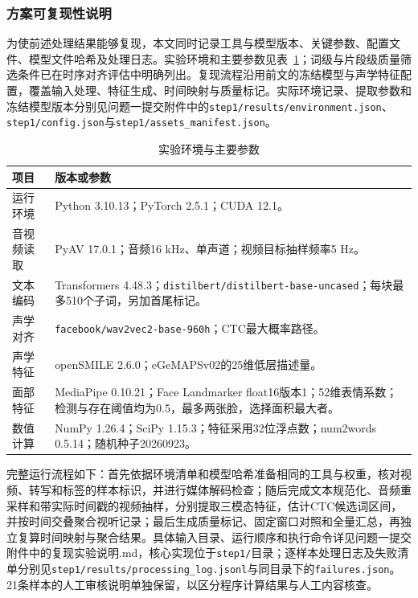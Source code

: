 \subsubsection{方案可复现性说明}
\label{sec:p1_reproducibility}

为使前述处理结果能够复现，本文同时记录工具与模型版本、关键参数、配置文件、模型文件哈希及处理日志。实验环境和主要参数见表~\ref{tab:p1_repro_settings}；词级与片段级质量筛选条件已在时序对齐评估中明确列出。复现流程沿用前文的冻结模型与声学特征配置，覆盖输入处理、特征生成、时间映射与质量标记。实际环境记录、提取参数和冻结模型版本分别见问题一提交附件中的\nolinkurl{step1/results/environment.json}、\nolinkurl{step1/config.json}与\nolinkurl{step1/assets_manifest.json}。

\begin{table}[H]
    \centering\small
    \caption{实验环境与主要参数}
    \label{tab:p1_repro_settings}
    \setlength{\tabcolsep}{6pt}
    \renewcommand{\arraystretch}{1.12}
    \ifdefined\pOneCompactTableBox\else\newsavebox{\pOneCompactTableBox}\fi
    \begin{lrbox}{\pOneCompactTableBox}
    \begin{tabular}{l>{\raggedright\arraybackslash}p{27em}}
        \toprule
        项目 & 版本或参数\\
        \midrule
        运行环境 & Python 3.10.13；PyTorch 2.5.1；CUDA 12.1。\\
        音视频读取 & PyAV 17.0.1；音频16 kHz、单声道；视频目标抽样频率5 Hz。\\
        文本编码 & Transformers 4.48.3；\nolinkurl{distilbert/distilbert-base-uncased}；每块最多510个子词，另加首尾标记。\\
        声学对齐 & \nolinkurl{facebook/wav2vec2-base-960h}；CTC最大概率路径。\\
        声学特征 & openSMILE 2.6.0；eGeMAPSv02的25维低层描述量。\\
        面部特征 & MediaPipe 0.10.21；Face Landmarker float16版本1；52维表情系数；检测与存在阈值均为0.5，最多两张脸，选择面积最大者。\\
        数值计算 & NumPy 1.26.4；SciPy 1.15.3；特征采用32位浮点数；num2words 0.5.14；随机种子20260923。\\
        \bottomrule
    \end{tabular}
    \end{lrbox}
    \usebox{\pOneCompactTableBox}
\end{table}

完整运行流程如下：首先依据环境清单和模型哈希准备相同的工具与权重，核对视频、转写和标签的样本标识，并进行媒体解码检查；随后完成文本规范化、音频重采样和带实际时间戳的视频抽样，分别提取三模态特征，估计CTC候选词区间，并按时间交叠聚合视听记录；最后生成质量标记、固定窗口对照和全量汇总，再独立复算时间映射与聚合结果。具体输入目录、运行顺序和执行命令详见问题一提交附件中的\textnormal{复现实验说明.md}，核心实现位于\nolinkurl{step1/}目录；逐样本处理日志及失败清单分别见\nolinkurl{step1/results/processing_log.jsonl}与同目录下的\nolinkurl{failures.json}。21条样本的人工审核说明单独保留，以区分程序计算结果与人工内容核查。

